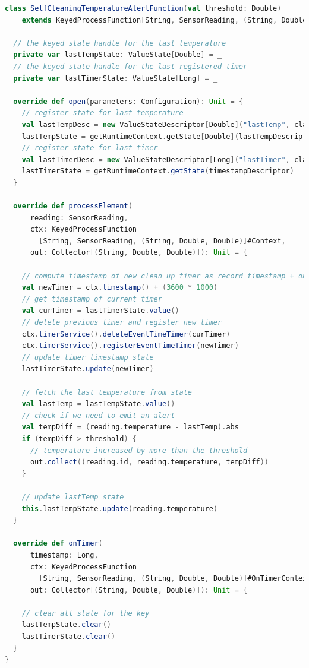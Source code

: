 \documentclass[oneside]{ctexbook}
\begin{document}
\begin{lstlisting}[language=scala]
class SelfCleaningTemperatureAlertFunction(val threshold: Double)
    extends KeyedProcessFunction[String, SensorReading, (String, Double, Double)] {

  // the keyed state handle for the last temperature
  private var lastTempState: ValueState[Double] = _
  // the keyed state handle for the last registered timer
  private var lastTimerState: ValueState[Long] = _

  override def open(parameters: Configuration): Unit = {
    // register state for last temperature
    val lastTempDesc = new ValueStateDescriptor[Double]("lastTemp", classOf[Double])
    lastTempState = getRuntimeContext.getState[Double](lastTempDescriptor)
    // register state for last timer
    val lastTimerDesc = new ValueStateDescriptor[Long]("lastTimer", classOf[Long])
    lastTimerState = getRuntimeContext.getState(timestampDescriptor)
  }

  override def processElement(
      reading: SensorReading,
      ctx: KeyedProcessFunction
        [String, SensorReading, (String, Double, Double)]#Context,
      out: Collector[(String, Double, Double)]): Unit = {

    // compute timestamp of new clean up timer as record timestamp + one hour
    val newTimer = ctx.timestamp() + (3600 * 1000)
    // get timestamp of current timer
    val curTimer = lastTimerState.value()
    // delete previous timer and register new timer
    ctx.timerService().deleteEventTimeTimer(curTimer)
    ctx.timerService().registerEventTimeTimer(newTimer)
    // update timer timestamp state
    lastTimerState.update(newTimer)

    // fetch the last temperature from state
    val lastTemp = lastTempState.value()
    // check if we need to emit an alert
    val tempDiff = (reading.temperature - lastTemp).abs
    if (tempDiff > threshold) {
      // temperature increased by more than the threshold
      out.collect((reading.id, reading.temperature, tempDiff))
    }

    // update lastTemp state
    this.lastTempState.update(reading.temperature)
  }

  override def onTimer(
      timestamp: Long,
      ctx: KeyedProcessFunction
        [String, SensorReading, (String, Double, Double)]#OnTimerContext,
      out: Collector[(String, Double, Double)]): Unit = {

    // clear all state for the key
    lastTempState.clear()
    lastTimerState.clear()
  }
}
\end{lstlisting}
\end{document}
